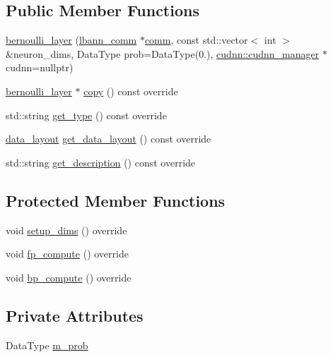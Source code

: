 \subsection*{Public Member Functions}
\begin{DoxyCompactItemize}
\item 
\hyperlink{classlbann_1_1bernoulli__layer_a59ea36ca262436f918f06cf3ea43d999}{bernoulli\+\_\+layer} (\hyperlink{classlbann_1_1lbann__comm}{lbann\+\_\+comm} $\ast$\hyperlink{file__io_8cpp_ab048c6f9fcbcfaa57ce68b00263dbebe}{comm}, const std\+::vector$<$ int $>$ \&neuron\+\_\+dims, Data\+Type prob=Data\+Type(0.), \hyperlink{classlbann_1_1cudnn_1_1cudnn__manager}{cudnn\+::cudnn\+\_\+manager} $\ast$cudnn=nullptr)
\item 
\hyperlink{classlbann_1_1bernoulli__layer}{bernoulli\+\_\+layer} $\ast$ \hyperlink{classlbann_1_1bernoulli__layer_acf1c58e256f8f5c494a15be4537cdb37}{copy} () const override
\item 
std\+::string \hyperlink{classlbann_1_1bernoulli__layer_a077a9d4c6846e97c6d6f2614898d44b8}{get\+\_\+type} () const override
\item 
\hyperlink{base_8hpp_a786677cbfb3f5677b4d84f3056eb08db}{data\+\_\+layout} \hyperlink{classlbann_1_1bernoulli__layer_aad1be2449edaa224b44bb6cef47599e9}{get\+\_\+data\+\_\+layout} () const override
\item 
std\+::string \hyperlink{classlbann_1_1bernoulli__layer_a9d46943959793d5ba5e5eebe26063dad}{get\+\_\+description} () const override
\end{DoxyCompactItemize}
\subsection*{Protected Member Functions}
\begin{DoxyCompactItemize}
\item 
void \hyperlink{classlbann_1_1bernoulli__layer_aabaf1d2ba92aa4c708d3a76d82bdbdb6}{setup\+\_\+dims} () override
\item 
void \hyperlink{classlbann_1_1bernoulli__layer_ad3b8939b6df375880247ef54f370ceb1}{fp\+\_\+compute} () override
\item 
void \hyperlink{classlbann_1_1bernoulli__layer_ae7e19bd34b17e1503755ac6e6b1260aa}{bp\+\_\+compute} () override
\end{DoxyCompactItemize}
\subsection*{Private Attributes}
\begin{DoxyCompactItemize}
\item 
Data\+Type \hyperlink{classlbann_1_1bernoulli__layer_a4f4b68b455233b5e4c5c6f992289669c}{m\+\_\+prob}
\end{DoxyCompactItemize}
